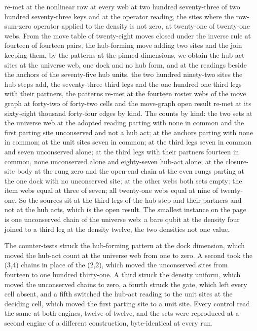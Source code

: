 \begin{chproof}
re-met at the nonlinear row at every web at two hundred seventy-three of two hundred seventy-three keys and at the operator reading, the sites where the row-sum-zero operator applied to the density is not zero, at twenty-one of twenty-one webs. From the move table of twenty-eight moves closed under the inverse rule at fourteen of fourteen pairs, the hub-forming move adding two sites and the join keeping them, by the patterns at the pinned dimensions, we obtain the hub-act sites at the universe web, one dock and no hub form, and at the readings beside the anchors of the seventy-five hub units, the two hundred ninety-two sites the hub steps add, the seventy-three third legs and the one hundred one third legs with their partners, the patterns re-met at the fourteen roster webs of the move graph at forty-two of forty-two cells and the move-graph open result re-met at its sixty-eight thousand forty-four edges by kind. The counts by kind: the two sets at the universe web at the adopted reading parting with none in common and the first parting site unconserved and not a hub act; at the anchors parting with none in common; at the unit sites seven in common; at the third legs seven in common and seven unconserved alone; at the third legs with their partners fourteen in common, none unconserved alone and eighty-seven hub-act alone; at the closure-site body at the rung zero and the open-end chain at the even rungs parting at the one dock with no unconserved site; at the other webs both sets empty; the item webs equal at three of seven; all twenty-one webs equal at nine of twenty-one. So the sources sit at the third legs of the hub step and their partners and not at the hub acts, which is the open result. The smallest instance on the page is one unconserved chain of the universe web: a bare qubit at the density four joined to a third leg at the density twelve, the two densities not one value.

The counter-tests struck the hub-forming pattern at the dock dimension, which moved the hub-act count at the universe web from one to zero. A second took the (3,4) chains in place of the (2,2), which moved the unconserved sites from fourteen to one hundred thirty-one. A third struck the density uniform, which moved the unconserved chains to zero, a fourth struck the gate, which left every cell absent, and a fifth switched the hub-act reading to the unit sites at the deciding cell, which moved the first parting site to a unit site. Every control read the same at both engines, twelve of twelve, and the sets were reproduced at a second engine of a different construction, byte-identical at every run.
\end{chproof}
